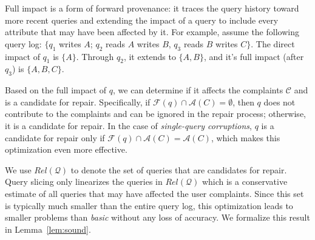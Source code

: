
Full impact is a form of forward provenance: it traces the query history
toward more recent queries and extending the impact of a query to include
every attribute that may have been affected by it. For example, assume the
following query log: $\{q_1$ writes $A$; $q_2$ reads $A$ writes $B$, $q_3$
reads $B$ writes $C\}$. The direct impact of $q_1$ is $\{A\}$. Through $q_2$,
it extends to $\{A,B\}$, and it's full impact (after $q_3$) is $\{A, B, C\}$.

Based on the full impact of $q$, we can determine if it affects the complaints
$\mathcal{C}$ and is a candidate for repair. Specifically, if $\mathcal{F}(q)
\cap \mathcal{A}(C)=\emptyset$, then $q$ does not contribute to the complaints
and can be ignored in the repair process; otherwise, it is a candidate for
repair. In the case of \emph{single-query corruptions}, $q$ is a candidate for
repair only if $\mathcal{F}(q) \cap \mathcal{A}(C)=\mathcal{A}(C)$, which
makes this optimization even more effective.


We use $Rel\mathcal{(Q)}$ to denote the set of
queries that are candidates for repair.
Query slicing only linearizes the queries in $Rel\mathcal{(Q)}$ which
is a conservative estimate of all queries that may have affected the user
complaints. Since this set is typically much smaller than the entire query
log, this optimization leads to smaller problems than \emph{basic} without any
loss of accuracy.  We formalize this result in Lemma~\ref{lem:sound}.

